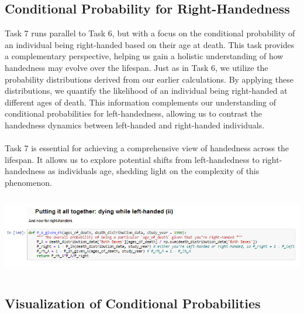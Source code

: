 \documentclass{article}
\begin{document}
\newpage
\subsection{Conditional Probability for Right-Handedness}

Task 7 runs parallel to Task 6, but with a focus on the conditional probability of an individual being right-handed based on their age at death. This task provides a complementary perspective, helping us gain a holistic understanding of how handedness may evolve over the lifespan. Just as in Task 6, we utilize the probability distributions derived from our earlier calculations. By applying these distributions, we quantify the likelihood of an individual being right-handed at different ages of death. This information complements our understanding of conditional probabilities for left-handedness, allowing us to contrast the handedness dynamics between left-handed and right-handed individuals.\\ \\Task 7 is essential for achieving a comprehensive view of handedness across the lifespan. It allows us to explore potential shifts from left-handedness to right-handedness as individuals age, shedding light on the complexity of this phenomenon.

\vspace{0.5cm}
        \begin{center}
            \includegraphics[height=100pt]{7.png}
        \end{center}
\vspace{1cm}

\subsection{Visualization of Conditional Probabilities}
\end{document}
